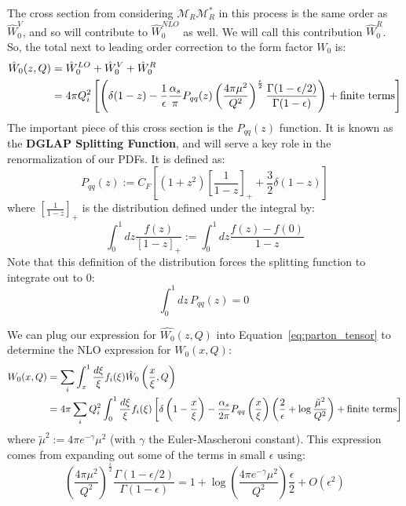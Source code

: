 \documentclass[11pt, oneside]{article}   	%
\theoremstyle{definition}
\begin{document}
The cross section from considering $\mathcal M_R\mathcal M_R^*$ in this process is the same order as $\hat W_0^V$, and so will contribute 
to $\hat W_0^{NLO}$ as well. We will call this contribution $\hat W_0^R$. So, the total next to leading order correction to the form factor $W_0$ is:
\begin{align}
	\hat W_0(z, Q) &= \hat W_0^{LO} + \hat W_0^V + \hat W_0^R \\
	&= 4\pi Q_i^2\left[\left(\delta(1 - z) - \frac{1}{\epsilon}\frac{\alpha_s}{\pi} P_{qq}(z)\left(\frac{4\pi\mu^2}{Q^2}\right)^{\frac{\epsilon}{2}}
	\frac{\Gamma(1 - \epsilon / 2)}{\Gamma(1 - \epsilon)}\right) + \textnormal{finite terms}\right]
\end{align}
The important piece of this cross section is the $P_{qq}(z)$ function. It is known as the \textbf{DGLAP Splitting Function}, and will serve a key 
role in the renormalization of our PDFs. It is defined as:
\begin{equation}
	P_{qq}(z) := C_F\left[(1 + z^2)\left[\frac{1}{1 - z}\right]_+ + \frac{3}{2}\delta(1 - z)\right]
\end{equation}
where $\left[\frac{1}{1 - z}\right]_+$ is the distribution defined under the integral by:
\begin{equation}
	\int_0^1 dz\frac{f(z)}{[1 - z]_+} := \int_0^1 dz\frac{f(z) - f(0)}{1 - z}
\end{equation}
Note that this definition of the distribution forces the splitting function to integrate out to 0:
\begin{equation}
	\int_0^1 dz\, P_{qq}(z) = 0~
	\label{eq:splitting_integral}
\end{equation}

We can plug our expression for $\hat{W_0}(z, Q)$ into Equation~\ref{eq:parton_tensor} to determine the NLO expression for $W_0(x, Q)$:
\begin{align}
	W_0(x, Q) &= \sum_i \int_x^1\frac{d\xi}{\xi} f_i(\xi)\hat{W}_0\left(\frac{x}{\xi}, Q\right)  \\
	&= 4\pi\sum_i Q_i^2\int_0^1\frac{d\xi}{\xi} f_i(\xi)\left[\delta\left(1 - \frac{x}{\xi}\right) - \frac{\alpha_s}{2\pi} P_{qq}\left(\frac{x}{\xi}\right)
	\left(\frac{2}{\epsilon} + \log\frac{\tilde\mu^2}{Q^2}\right)
	 + \textnormal{finite terms}
	\right]
\end{align}
where $\tilde\mu^2 := 4\pi e^{-\gamma}\mu^2$ (with $\gamma$ the Euler-Mascheroni constant). This expression comes from expanding out some of 
the terms in small $\epsilon$ using:
\begin{equation}
	\left(\frac{4\pi\mu^2}{Q^2}\right)^{\frac{\epsilon}{2}}\frac{\Gamma(1 - \epsilon / 2)}{\Gamma(1 - \epsilon)} = 1 + \log\left(\frac{4\pi e^{-\gamma}
	\mu^2}{Q^2}\right)\frac{\epsilon}{2} + O(\epsilon^2)
\end{equation}
\end{document}
